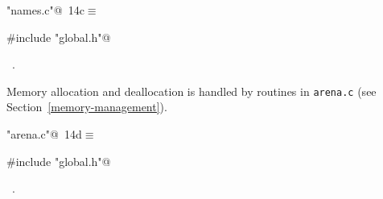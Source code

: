 \documentclass[a4paper]{report}
\begin{document}
\begin{flushleft} \small
\begin{minipage}{\linewidth}\label{scrap12}\raggedright\small
{} \verb@"names.c"@\nobreak\ {\footnotesize {14c}}$\equiv$
\vspace{-1ex}
\begin{list}{}{} \item
\mbox{}\verb@#include "global.h"@\\
\mbox{}\verb@@{\NWsep}
\end{list}
\vspace{-1.5ex}
\footnotesize
\begin{list}{}{\setlength{\itemsep}{-\parsep}\setlength{\itemindent}{-\leftmargin}}
\item \NWtxtFileDefBy\ .

\item{}
\end{list}
\end{minipage}\vspace{4ex}
\end{flushleft}
Memory allocation and deallocation is handled by routines in \verb|arena.c|
(see Section~\ref{memory-management}).
\begin{flushleft} \small
\begin{minipage}{\linewidth}\label{scrap13}\raggedright\small
{} \verb@"arena.c"@\nobreak\ {\footnotesize {14d}}$\equiv$
\vspace{-1ex}
\begin{list}{}{} \item
\mbox{}\verb@#include "global.h"@\\
\mbox{}\verb@@{\NWsep}
\end{list}
\vspace{-1.5ex}
\footnotesize
\begin{list}{}{\setlength{\itemsep}{-\parsep}\setlength{\itemindent}{-\leftmargin}}
\item \NWtxtFileDefBy\ .

\item{}
\end{list}
\end{minipage}\vspace{4ex}
\end{flushleft}
\end{document}
